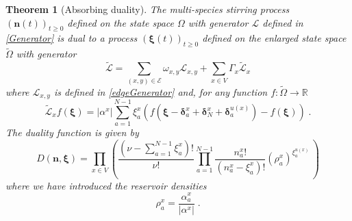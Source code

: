 \documentclass[10pt]{article}
\numberwithin{equation}{section}
\numberwithin{equation}{subsection}
\newtheorem{theorem}{Theorem}
\newcommand{\dt}{\;.}
\begin{document}
\begin{theorem}[Absorbing duality]\label{thm-duality}
	The multi-species stirring process $(\bm{n}(t))_{t\geq 0}$ defined on the state space $\Omega$ with generator $\mathcal{L}$ defined in \eqref{Generator} is dual to a process $(\bm{\xi}(t))_{t\geq 0}$ defined on the enlarged state space $\widetilde{\Omega}$ with generator
	 \begin{equation}\label{DualGenerator}
		\widetilde{\mathcal{L}}=\sum_{(x,y)\in \mathcal{E}}\omega_{x,y}\mathcal{L}_{x,y}+\sum_{x\in V}\Gamma_{x}\widetilde{\mathcal{L}}_{x}
	\end{equation}
where 
$\mathcal{L}_{x,y}$ is defined in \eqref{edgeGenerator} and, for any function $f:\widetilde{\Omega}\to \mathbb{R}$ 
\begin{equation}\label{siteDualGenerator}
	\widetilde{\mathcal{L}}_{x}f(\bm{\xi})=|\alpha^{x}|\sum_{a=1}^{N-1}\xi_{a}^{x}\left(f(\bm{\xi}-\bm{\delta}_{a}^{x}+\bm{\delta}_{N}^{x}+\bm{\delta}_{a}^{u(x)})-f(\bm{\xi})\right)\dt
\end{equation}
The duality function is given by 
\begin{equation}\label{dualityElements}
	D(\bm{n},\bm{\xi})=\prod_{x\in V}\left(\frac{(\nu -\sum_{a=1}^{N-1}\xi_{a}^{x})!}{\nu!}\prod_{a=1}^{N-1}\frac{n_{a}^{x}!}{(n_{a}^{x}-\xi_{a}^{x})!}\left(\rho_{a}^{x}\right)^{\xi_{a}^{u(x)}}\,\right)
\end{equation}
where we have introduced the reservoir densities
\begin{equation}
	\rho_{a}^{x}=\frac{\alpha_{a}^{x}}{|\alpha^{x}|}\dt
\end{equation}
\end{theorem}
\begin{comment}
We define the duality function of the open multi-species stirring process as
\begin{equation}\label{dualityElements}
	D(\bm{n},\bm{\xi})=\prod_{x\in V}\left(\frac{(\nu -\sum_{a=1}^{N-1}\xi_{a}^{x})!}{\nu!}\prod_{a=1}^{N-1}\frac{n_{a}^{x}!}{(n_{a}^{x}-\xi_{a}^{x})!}\left(\rho_{a}^{x}\right)^{\xi_{a}^{u(x)}}\,\right)
\end{equation}
where we recall the notation (see \eqref{rhox}) for the \textit{density} of the species $a\in \{1,\ldots,N-1\}$ imposed by the reservoir at site $x\in V$:
\begin{equation}
\rho_{a}^{x}=\frac{\alpha_{a}^{x}}{|\alpha^{x}|}\dt
\end{equation}
The dual process is defined by its Markov generator, which reads
 \begin{equation}\label{DualGenerator}
    \widetilde{\mathcal{L}}=\sum_{(x,y)\in \mathcal{E}}\omega_{x,y}\mathcal{L}_{x,y}+\sum_{x\in V}\Gamma_{x}\widetilde{\mathcal{L}}_{x}
\end{equation}
where 
$\mathcal{L}_{x,y}$ is defined in \eqref{edgeGenerator} and, for any function $f:\widetilde{\Omega}\to \mathbb{R}$ 
\begin{equation}\label{siteDualGenerator}
    \widetilde{\mathcal{L}}_{x}f(\bm{\xi})=|\alpha^{x}|\sum_{a=1}^{N-1}\xi_{a}^{x}\left(f(\bm{\xi}-\bm{\delta}_{a}^{x}+\bm{\delta}_{N}^{x}+\bm{\delta}_{a}^{u(x)})-f(\bm{\xi})\right)\dt
\end{equation}
\newline
\end{comment}
\end{document}
